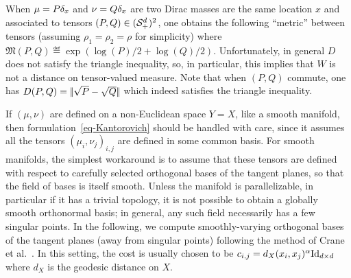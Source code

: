 \begin{rem}
	When $\mu=P \delta_{x}$ and $\nu=Q \delta_{x}$ are two Dirac masses are the same location $x$ and associated to tensors $(P,Q) \in (\mathcal{S}_+^d)^2$,
	one obtains the following ``metric'' between tensors (assuming $\rho_1=\rho_2=\rho$ for simplicity)
	where $\mathfrak{M}(P,Q) \eqdef \exp(\log(P)/2+\log(Q)/2)$.
	Unfortunately, in general $D$ does not satisfy the triangle inequality, so, in particular, this implies that $W$ is not a distance on tensor-valued measure.
	Note that when $(P,Q)$ commute, one has $D(P,Q) = |\!| \sqrt{P}-\sqrt{Q} |\!|$ which indeed satisfies the triangle inequality. 
	
%	
\end{rem}

\begin{rem}
	If $(\mu,\nu)$ are defined on a non-Euclidean space $Y=X$, like a smooth manifold, then formulation~\eqref{eq-Kantorovich} should be handled with care, since it assumes all the tensors $(\mu_i,\nu_j)_{i,j}$ are defined %
	in some common basis. 
	For smooth manifolds, the simplest workaround is to assume that these tensors are defined with respect to carefully selected orthogonal bases of the tangent planes, so that the field of bases is itself smooth. Unless the manifold is parallelizable, in particular if it has a trivial topology, it is not possible to obtain a globally smooth orthonormal basis; in general, any such field necessarily has a few singular points. In the following, we compute smoothly-varying orthogonal bases of the tangent planes (away from singular points) following the method of Crane et al.~. 
	In this setting, the cost is usually chosen to be $c_{i,j} = d_X(x_i,x_j)^\alpha \mathrm{Id}_{d \times d}$ where $d_X$ is the geodesic distance on $X$. 
\end{rem}

